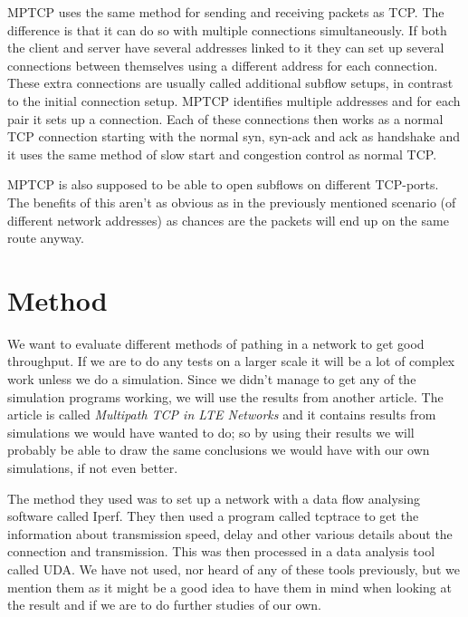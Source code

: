 \documentclass[11pt,twocolumn]{article}
\begin{document}
MPTCP uses the same method for sending and receiving packets as TCP. The difference is that it can do so with multiple connections simultaneously. If both the client and server have several addresses linked to it they can set up several connections between themselves using a different address for each connection. These extra connections are usually called additional subflow setups, in contrast to the initial connection setup. MPTCP identifies multiple addresses and for each pair it sets up a connection. Each of these connections then works as a normal TCP connection starting with the normal syn, syn-ack and ack as handshake and it uses the same method of slow start and congestion control as normal TCP.

MPTCP is also supposed to be able to open subflows on different TCP-ports. The benefits of this  aren't as obvious as in the previously mentioned scenario (of different network addresses) as chances are the packets will end up on the same route anyway. 

\section{Method}

We want to evaluate different methods of pathing in a network to get good throughput. If we are to do any tests on a larger scale it will be a lot of complex work unless we do a simulation. Since we didn't manage to get any of the simulation programs working, we will use the results from another article. The article is called \emph{Multipath TCP in LTE Networks} and it contains results from simulations we would have wanted to do; so by using their results we will probably be able to draw the same conclusions we would have with our own simulations, if not even better.

The method they used was to set up a network with a data flow analysing software called Iperf. They then used a program called tcptrace to get the information about transmission speed, delay and other various details about the connection and transmission. This was then processed in a data analysis tool called UDA. We have not used, nor heard of any of these tools previously, but we mention them as it might be a good idea to have them in mind when looking at the result and if we are to do further studies of our own.

\end{document}
